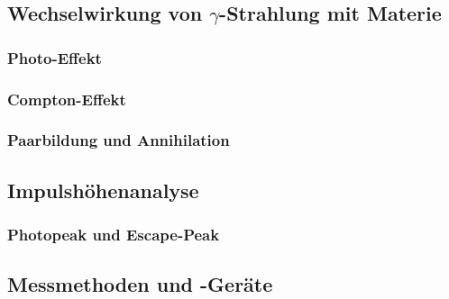 \subsection{Wechselwirkung von $\gamma$-Strahlung mit Materie}
\subsubsection*{Photo-Effekt}
\subsubsection*{Compton-Effekt}
\subsubsection*{Paarbildung und Annihilation}
\subsection{Impulshöhenanalyse}
\subsubsection*{Photopeak und Escape-Peak}
\subsection{Messmethoden und -Geräte}